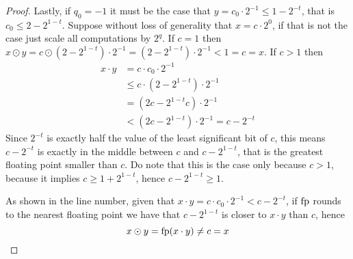 \begin{proof}
	Lastly, if $q_0 = -1$ it must be the case that $y = c_0 \cdot 2^{-1} \le 1 - 2^{-t}$, that is $c_0 \le 2 - 2^{1-t}$. Suppose without loss of generality that $x = c \cdot 2^0$, if that is not the case just scale all computations by $2^q$.
	If $c = 1$ then $x \odot y = c \odot (2 - 2^{1-t}) \cdot 2^{-1} = (2 - 2^{1-t}) \cdot 2^{-1} < 1 = c = x$. If $c > 1$ then
	\begin{align*}
		x \cdot y &= c \cdot c_0 \cdot 2^{-1} \\
		&\le c \cdot (2 - 2^{1-t}) \cdot 2^{-1} \\
		&= (2 c - 2^{1-t} c) \cdot 2^{-1} \\
		&< (2 c - 2^{1-t}) \cdot 2^{-1} = c - 2^{-t}
	\end{align*}
	Since $2^{-t}$ is exactly half the value of the least significant bit of $c$, this means $c - 2^{-t}$ is exactly in the middle between $c$ and $c - 2^{1-t}$, that is the greatest floating point smaller than $c$. Do note that this is the case only because $c > 1$, because it implies $c \ge 1 + 2^{1-t}$, hence $c - 2^{1-t} \ge 1$.
	\begin{center}
	\end{center}
	As shown in the line number, given that $x \cdot y = c \cdot c_0 \cdot 2^{-1} < c - 2^{-t}$, if $\text{fp}$ rounds to the nearest floating point we have that $c - 2^{1-t}$ is closer to $x \cdot y$ than $c$, hence
	\[
	x \odot y = \text{fp}(x \cdot y) \neq c = x
	\]
\end{proof}

